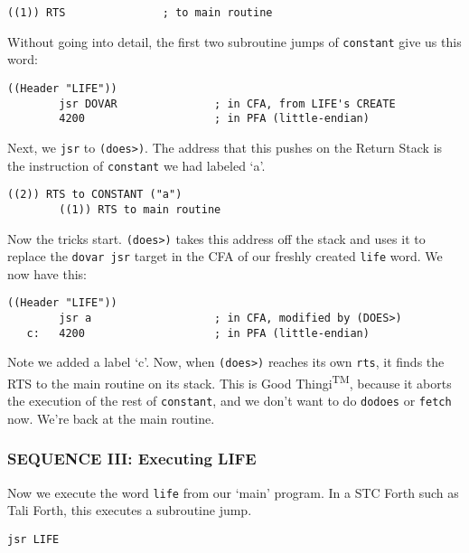 \begin{lstlisting}[frame=single]
        ((1)) RTS               ; to main routine 
\end{lstlisting}

Without going into detail, the first two subroutine jumps of \texttt{constant} give us
this word: 

\begin{lstlisting}[frame=single]
        ((Header "LIFE"))
        jsr DOVAR               ; in CFA, from LIFE's CREATE
        4200                    ; in PFA (little-endian)
\end{lstlisting}

Next, we \texttt{jsr} to \texttt{(does>)}. The address that this pushes on the Return Stack is
the instruction of \texttt{constant} we had labeled `a'. 

\begin{lstlisting}[frame=single]
        ((2)) RTS to CONSTANT ("a") 
        ((1)) RTS to main routine 
\end{lstlisting}

Now the tricks start. \texttt{(does>)} takes this address off the stack and uses
it to replace the \texttt{dovar jsr} target in the CFA of our freshly created
\texttt{life} word. We now have this: 

\begin{lstlisting}[frame=single]
        ((Header "LIFE"))
        jsr a                   ; in CFA, modified by (DOES>)
   c:   4200                    ; in PFA (little-endian)
\end{lstlisting}

Note we added a label `c'. Now, when \texttt{(does>)} reaches its own
\texttt{rts}, it finds the RTS to the main routine on its stack. This is Good
Thingi\textsuperscript{TM}, because it aborts the execution of the rest of
\texttt{constant}, and we don't want to do \texttt{dodoes} or \texttt{fetch}
now.  We're back at the main routine. 


\subsubsection{SEQUENCE III: Executing LIFE}

Now we execute the word \texttt{life} from our `main' program. In a STC Forth
such as Tali Forth, this executes a subroutine jump.

\begin{lstlisting}[frame=single]
        jsr LIFE
\end{lstlisting}

